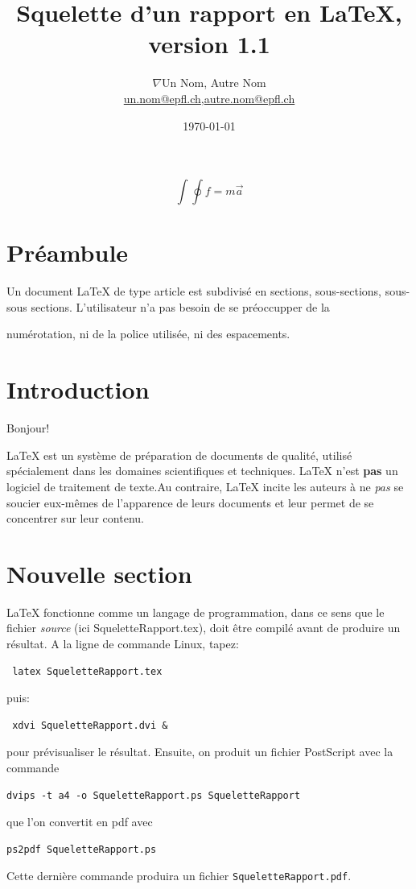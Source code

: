 \documentclass[a4paper,12pt,twoside]{article}
\newcommand{\mail}[1]{{\href{mailto:#1}{#1}}}
\begin{document}
\title{Squelette d'un rapport en \LaTeX, version 1.1}
\author{$\nabla$Un Nom, Autre Nom\\  %
{\small \mail{un.nom@epfl.ch},\mail{autre.nom@epfl.ch}}}
\date{\today}\maketitle
\tableofcontents %
\[ \int \oint f=m\overrightarrow{a} \]
\baselineskip=16pt
\parindent=0pt
\parskip=12pt

\section{Préambule}

Un document \LaTeX{} de type article  est subdivis\'e en sections, sous-sections, sous-sous sections.                                   L'utilisateur n'a pas
besoin de se pr\'eoccupper
de la

 num\'erotation, ni de la police utilis\'ee, ni des espacements.

\section{Introduction} %

Bonjour!

\LaTeX{} est un syst\`eme de pr\'eparation de documents de qualit\'e, utilis\'e sp\'ecialement dans les domaines scientifiques et techniques. \LaTeX{} n'est \textbf{pas} un logiciel de traitement de texte.Au contraire, \LaTeX{} incite les auteurs \`a ne \textit{pas} se soucier eux-m\^emes de l'apparence de leurs documents et leur permet de se concentrer sur leur contenu.

\section{Nouvelle section}

\LaTeX{} fonctionne comme un langage de programmation, dans ce sens que le fichier \textit{source} (ici SqueletteRapport.tex), doit \^etre compil\'e avant de produire un r\'esultat. A la ligne de commande Linux, tapez:
\begin{verbatim}
 latex SqueletteRapport.tex
\end{verbatim}
puis:
\begin{verbatim}
 xdvi SqueletteRapport.dvi &
\end{verbatim}
pour pr\'evisualiser le r\'esultat. Ensuite, on produit un fichier PostScript avec la commande
\begin{verbatim}
dvips -t a4 -o SqueletteRapport.ps SqueletteRapport
\end{verbatim}
que l'on convertit en pdf avec
\begin{verbatim}
ps2pdf SqueletteRapport.ps
\end{verbatim}
Cette derni\`ere commande produira un fichier \verb+SqueletteRapport.pdf+.
\end{document}
